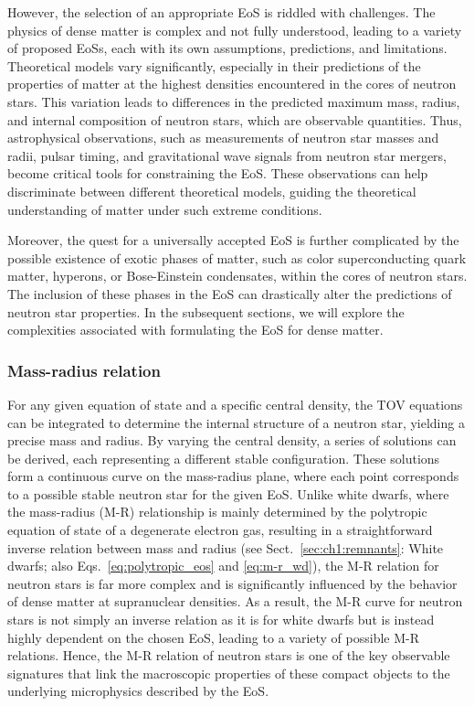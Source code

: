 \documentclass[main.tex]{subfiles}
\begin{document}
    However, the selection of an appropriate EoS is riddled with challenges. The physics of dense matter is complex and not fully understood, leading to a variety of proposed EoSs, each with its own assumptions, predictions, and limitations. Theoretical models vary significantly, especially in their predictions of the properties of matter at the highest densities encountered in the cores of neutron stars. This variation leads to differences in the predicted maximum mass, radius, and internal composition of neutron stars, which are observable quantities. Thus, astrophysical observations, such as measurements of neutron star masses and radii, pulsar timing, and gravitational wave signals from neutron star mergers, become critical tools for constraining the EoS. These observations can help discriminate between different theoretical models, guiding the theoretical understanding of matter under such extreme conditions.
    
    Moreover, the quest for a universally accepted EoS is further complicated by the possible existence of exotic phases of matter, such as color superconducting quark matter, hyperons, or Bose-Einstein condensates, within the cores of neutron stars. The inclusion of these phases in the EoS can drastically alter the predictions of neutron star properties. In the subsequent sections, we will explore the complexities associated with formulating the EoS for dense matter.
    
    \subsubsection{Mass-radius relation}
    For any given equation of state and a specific central density, the TOV equations can be integrated to determine the internal structure of a neutron star, yielding a precise mass and radius. By varying the central density, a series of solutions can be derived, each representing a different stable configuration. These solutions form a continuous curve on the mass-radius plane, where each point corresponds to a possible stable neutron star for the given EoS. Unlike white dwarfs, where the mass-radius (M-R) relationship is mainly determined by the polytropic equation of state of a degenerate electron gas, resulting in a straightforward inverse relation between mass and radius (see Sect.~\ref{sec:ch1:remnants}: White dwarfs; also Eqs.~\ref{eq:polytropic_eos} and \ref{eq:m-r_wd}), the M-R relation for neutron stars is far more complex and is significantly influenced by the behavior of dense matter at supranuclear densities. As a result, the M-R curve for neutron stars is not simply an inverse relation as it is for white dwarfs but is instead highly dependent on the chosen EoS, leading to a variety of possible M-R relations. Hence, the M-R relation of neutron stars is one of the key observable signatures that link the macroscopic properties of these compact objects to the underlying microphysics described by the EoS.
    
\end{document}
